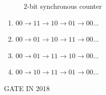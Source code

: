 \begin{enumerate}
\begin{figure}[!ht]
	\caption{$2$-bit synchronous counter}
	\label{fig:enter-label}
\end{figure}
\begin{enumerate}
	\item $00\rightarrow11\rightarrow10\rightarrow01\rightarrow00...$ 
        \item $00\rightarrow01\rightarrow10\rightarrow11\rightarrow00...$
        \item $00\rightarrow01\rightarrow11\rightarrow10\rightarrow00...$
        \item $00\rightarrow10\rightarrow11\rightarrow01\rightarrow00...$
\end{enumerate}
\hfill{GATE IN 2018}
\end{enumerate}
